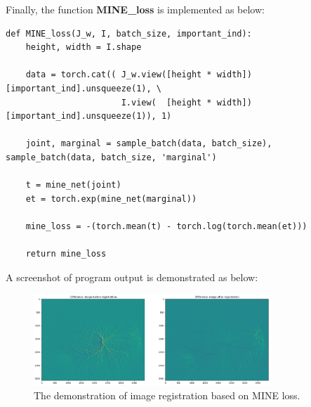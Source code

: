 \documentclass[UTF8]{article}
\begin{document}
Finally, the function \textbf{MINE\_loss} is implemented as below:
\begin{lstlisting}
def MINE_loss(J_w, I, batch_size, important_ind):
    height, width = I.shape

    data = torch.cat(( J_w.view([height * width])[important_ind].unsqueeze(1), \
                       I.view(  [height * width])[important_ind].unsqueeze(1)), 1)

    joint, marginal = sample_batch(data, batch_size), sample_batch(data, batch_size, 'marginal')

    t = mine_net(joint)
    et = torch.exp(mine_net(marginal))

    mine_loss = -(torch.mean(t) - torch.log(torch.mean(et)))

    return mine_loss
\end{lstlisting}
A screenshot of program output is demonstrated as below:
\begin{figure}[htbp]	%
\centering
\includegraphics[width=0.8\textwidth]{figure/registration.png}
    \caption{The demonstration of image registration based on MINE loss.}
\label{fig_bay}
\end{figure}

\end{document}
